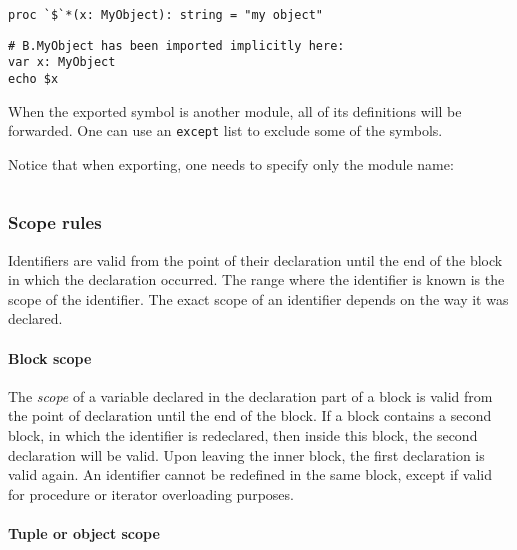 \begin{verbatim}
\end{verbatim}

\begin{verbatim}
proc `$`*(x: MyObject): string = "my object"
\end{verbatim}

\begin{verbatim}
# B.MyObject has been imported implicitly here:
var x: MyObject
echo $x
\end{verbatim}

When the exported symbol is another module, all of its definitions will
be forwarded. One can use an \texttt{except} list to exclude some of the
symbols.

Notice that when exporting, one needs to specify only the module name:

\begin{verbatim}
\end{verbatim}

\hypertarget{scope-rules}{%
\subsubsection{Scope rules}\label{scope-rules}}

Identifiers are valid from the point of their declaration until the end
of the block in which the declaration occurred. The range where the
identifier is known is the scope of the identifier. The exact scope of
an identifier depends on the way it was declared.

\hypertarget{block-scope}{%
\paragraph{Block scope}\label{block-scope}}

The \emph{scope} of a variable declared in the declaration part of a
block is valid from the point of declaration until the end of the block.
If a block contains a second block, in which the identifier is
redeclared, then inside this block, the second declaration will be
valid. Upon leaving the inner block, the first declaration is valid
again. An identifier cannot be redefined in the same block, except if
valid for procedure or iterator overloading purposes.

\hypertarget{tuple-or-object-scope}{%
\paragraph{Tuple or object scope}\label{tuple-or-object-scope}}

